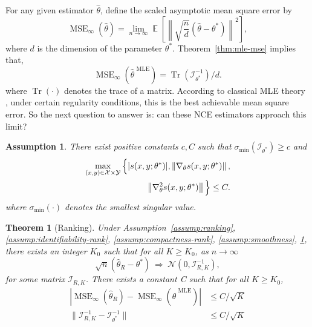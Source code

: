 \documentclass[11pt,a4paper]{article}
\DeclareMathOperator{\E}{\mathbb{E}}
\newcommand{\mse}{\operatorname{MSE}}
\newcommand{\tr}{\operatorname{Tr}}
\newcommand{\wh}[1]{\widehat{#1}}
\newcommand{\gtheta}{\ensuremath \nabla_{\theta}}
\newcommand{\mle}{\wh{\theta}^{\text{~MLE}}}
\newcommand{\str}[3]{s(#1, #2; #3)}
\newcommand{\vnorm}[1]{\left\| #1 \right\|}
\newcommand{\fisher}{\mathcal{I}_{\theta^*}}
\newtheorem{theorem}{Theorem}[section]
\newtheorem{assumption}{Assumption}[section]
\begin{document}
For any given estimator $\wh{\theta}$, define the scaled asymptotic mean square error by 
\[
\mse_{\infty} (\wh{\theta}) = \lim_{n\rightarrow\infty} \E \left[  \vnorm{ \sqrt{\frac{n}{d}}\left(\wh{\theta} - \theta^*\right) }^2\right],
\]
where $d$ is the dimension of the parameter $\theta^*$.
Theorem~\ref{thm:mle-mse} implies that, 
\[
\mse_{\infty} (\mle) = \tr(\fisher^{-1})/d. 
\]
where $\tr(\cdot)$ denotes the trace of a matrix. According to classical MLE theory \citep{ferguson1996course}, under certain regularity conditions, this is the best achievable mean square error. So the next question to answer is: can these NCE estimators approach this limit? 
\begin{assumption}
There exist positive constants $c, C$ such that $\sigma_{\min}(\fisher) \geq c$ and
\begin{equation*}
\begin{aligned}
\max_{(x, y)\in\mathcal{X}\times \mathcal{Y}} \Big\{ |\str{x}{y}{\theta^*}|, \vnorm{\gtheta \str{x}{y}{\theta^*}},  \\
\vnorm{\gtheta^2 \str{x}{y}{\theta^*}}\Big\} \leq C.  
\end{aligned}
\end{equation*}
where $\sigma_{\min}(\cdot)$ denotes the smallest singular value. 
  \label{assump:boundedness}
\end{assumption}


\begin{theorem}[Ranking]
  Under Assumption~\ref{assump:ranking}, \ref{assump:identifiability-rank}, \ref{assump:compactness-rank}, \ref{assump:smoothness}, \ref{assump:boundedness}, there exists an integer $K_0$ such that for all $K\geq K_0$, as $n \rightarrow\infty$
  \begin{equation}
    \sqrt{n}\left(\wh{\theta}_R -\theta^* \right) ~\Rightarrow~\mathcal{N}(0, \mathcal{I}_{R, K}^{-1}), 
\end{equation}
for some matrix $\mathcal{I}_{R, K}$. There exists a constant C such that for all $K\geq K_0$, 
\begin{equation*}
\begin{aligned}
 |\mse_{\infty} (\wh{\theta}_R) -  \mse_{\infty} (\mle)| &\leq C/\sqrt{K}\\
\|\mathcal{I}_{R, K}^{-1} -  \fisher^{-1}\| &\leq C / \sqrt{K}
\end{aligned}
\end{equation*}
  \label{thm:ranking-mse}
\vspace{-0.4cm}
\end{theorem}
\end{document}
